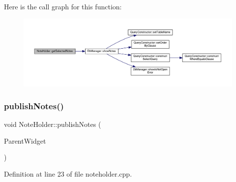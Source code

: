Here is the call graph for this function\+:
\nopagebreak
\begin{figure}[H]
\begin{center}
\leavevmode
\includegraphics[width=350pt]{classNoteHolder_ab4709f2b857351ba118201a159c5cd6c_cgraph}
\end{center}
\end{figure}
\hypertarget{classNoteHolder_abb4a2d19ddace4d652cfda5becd03302}{}\label{classNoteHolder_abb4a2d19ddace4d652cfda5becd03302} 
\subsubsection{\texorpdfstring{publish\+Notes()}{publishNotes()}}
{\footnotesize\ttfamily void Note\+Holder\+::publish\+Notes (\begin{DoxyParamCaption}\item[{Q\+Widget $\ast$}]{Parent\+Widget }\end{DoxyParamCaption})\hspace{0.3cm}{\ttfamily [static]}}



Definition at line 23 of file noteholder.\+cpp.


